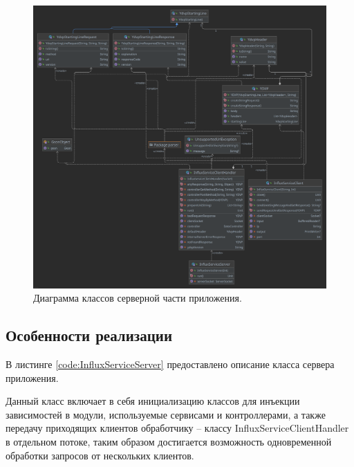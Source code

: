 \begin{figure}[H]
	\centering
	\includegraphics[width=\textwidth]{img/serverDiagram.png}
	\caption{Диаграмма классов серверной части приложения. }
	\label{fig:serverAndProtocol}
\end{figure}

\subsection{Особенности реализации}
В листинге \ref{code:InfluxServiceServer} предоставлено описание класса сервера приложения.

Данный класс включает в себя инициализацию классов для инъекции зависимостей в модули, используемые сервисами и контроллерами, а также передачу приходящих клиентов обработчику -- классу InfluxServiceClientHandler в отдельном потоке, таким образом достигается возможность одновременной обработки запросов от нескольких клиентов.


